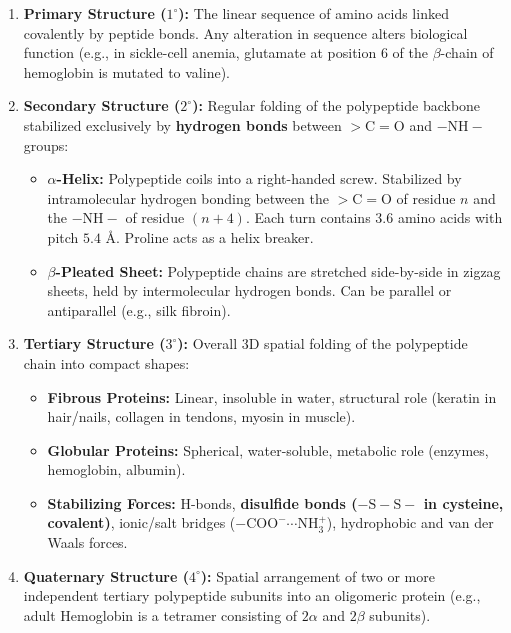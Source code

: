 \documentclass[10pt,twoside,openright]{book}
\begin{document}
\begin{formulabox}
\begin{enumerate}[leftmargin=*]
  \item \textbf{Primary Structure ($1^\circ$):} The linear sequence of amino acids linked covalently by peptide bonds. Any alteration in sequence alters biological function (e.g., in sickle-cell anemia, glutamate at position 6 of the $\beta$-chain of hemoglobin is mutated to valine).
  \item \textbf{Secondary Structure ($2^\circ$):} Regular folding of the polypeptide backbone stabilized exclusively by \textbf{hydrogen bonds} between $>\mathrm{C=O}$ and $-\mathrm{NH}-$ groups:
  \begin{itemize}
    \item \textbf{$\alpha$-Helix:} Polypeptide coils into a right-handed screw. Stabilized by intramolecular hydrogen bonding between the $>\mathrm{C=O}$ of residue $n$ and the $-\mathrm{NH}-$ of residue $(n+4)$. Each turn contains $3.6$ amino acids with pitch $5.4\text{ \AA}$. Proline acts as a helix breaker.
    \item \textbf{$\beta$-Pleated Sheet:} Polypeptide chains are stretched side-by-side in zigzag sheets, held by intermolecular hydrogen bonds. Can be parallel or antiparallel (e.g., silk fibroin).
  \end{itemize}
  \item \textbf{Tertiary Structure ($3^\circ$):} Overall 3D spatial folding of the polypeptide chain into compact shapes:
  \begin{itemize}
    \item \textbf{Fibrous Proteins:} Linear, insoluble in water, structural role (keratin in hair/nails, collagen in tendons, myosin in muscle).
    \item \textbf{Globular Proteins:} Spherical, water-soluble, metabolic role (enzymes, hemoglobin, albumin).
    \item \textbf{Stabilizing Forces:} H-bonds, \textbf{disulfide bonds ($-\mathrm{S-S-}$ in cysteine, covalent)}, ionic/salt bridges ($\mathrm{-COO^-\cdots NH_3^+}$), hydrophobic and van der Waals forces.
  \end{itemize}
  \item \textbf{Quaternary Structure ($4^\circ$):} Spatial arrangement of two or more independent tertiary polypeptide subunits into an oligomeric protein (e.g., adult Hemoglobin is a tetramer consisting of $2\alpha$ and $2\beta$ subunits).
\end{enumerate}
\end{formulabox}
\end{document}
